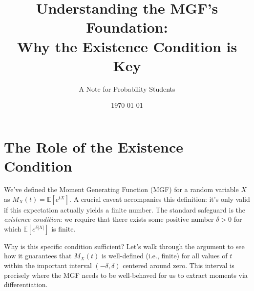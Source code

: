 \documentclass[12pt, letterpaper]{article}
\title{
    \vspace{-1cm} %
    \fontsize{16pt}{20pt}\selectfont %
    \textbf{Understanding the MGF's Foundation:} \\ %
    \large Why the Existence Condition is Key
}
\author{A Note for Probability Students}
\date{\today}
\newcommand{\E}{\mathbb{E}} %
\begin{document}
\maketitle

\section*{The Role of the Existence Condition}

We've defined the Moment Generating Function (MGF) for a random variable $X$ as $M_X(t) = \E[e^{tX}]$. A crucial caveat accompanies this definition: it's only valid if this expectation actually yields a finite number. The standard safeguard is the \emph{existence condition}: we require that there exists some positive number $\delta > 0$ for which $\E[e^{\delta|X|}]$ is finite.

Why is this specific condition sufficient? Let's walk through the argument to see how it guarantees that $M_X(t)$ is well-defined (i.e., finite) for all values of $t$ within the important interval $(-\delta, \delta)$ centered around zero. This interval is precisely where the MGF needs to be well-behaved for us to extract moments via differentiation.
\end{document}
